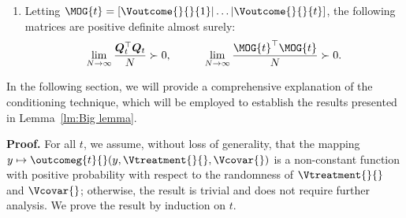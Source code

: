 \begin{lemma}
\begin{enumerate}[label=(\alph*)]
        \item \label{part:BL-c} Letting $\MOG{t} = [\Voutcome{}{}{1}|\ldots|\Voutcome{}{}{t}]$, the following matrices are positive definite almost surely:
        \begin{align}
            \label{eq:BL-lower bound for perps}
            \lim_{N \rightarrow \infty} \frac{\bm{Q}_{t}^\top \bm{Q}_{t}}{N} \succ 0,
            \quad\quad\quad
            \lim_{N \rightarrow \infty} \frac{\MOG{t}^\top \MOG{t}}{N} 
            \succ 0.
        \end{align}
    \end{enumerate}
\end{lemma}
In the following section, we will provide a comprehensive explanation of the conditioning technique, which will be employed to establish the results presented in Lemma~\ref{lm:Big lemma}.

\noindent
\textbf{Proof.}
% 
For all $t$, we assume, without loss of generality, that the mapping $y \mapsto \outcomeg{t}{}(y, \Vtreatment{}{}, \Vcovar{})$ is a non-constant function with positive probability with respect to the randomness of $\Vtreatment{}{}$ and $\Vcovar{}$; otherwise, the result is trivial and does not require further analysis. We prove the result by induction on $t$.

